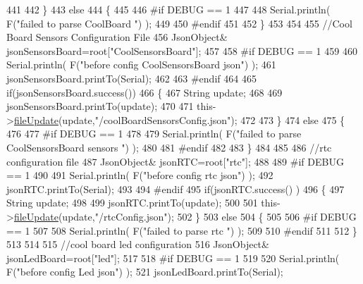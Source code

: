 \begin{DoxyCode}
441         
442     \}
443     \textcolor{keywordflow}{else}
444     \{
445     
446 \textcolor{preprocessor}{    #if DEBUG == 1 }
447 
448         Serial.println( F(\textcolor{stringliteral}{"failed to parse CoolBoard "}) );
449     
450 \textcolor{preprocessor}{    #endif}
451 
452     \}       
453 
454     
455     \textcolor{comment}{//Cool Board Sensors Configuration File}
456         JsonObject& jsonSensorsBoard=root[\textcolor{stringliteral}{"CoolSensorsBoard"}];
457 
458 \textcolor{preprocessor}{#if DEBUG == 1 }
459 
460     Serial.println( F(\textcolor{stringliteral}{"before config CoolSensorsBoard json"}) );
461     jsonSensorsBoard.printTo(Serial);
462 
463 \textcolor{preprocessor}{#endif }
464     
465     \textcolor{keywordflow}{if}(jsonSensorsBoard.success())
466     \{   
467         String update;
468     
469         jsonSensorsBoard.printTo(update);
470 
471         this->\hyperlink{classCoolFileSystem_a13f2958f5b87757c31fc53797a30d23a}{fileUpdate}(update,\textcolor{stringliteral}{"/coolBoardSensorsConfig.json"});      
472 
473     \}
474     \textcolor{keywordflow}{else}
475     \{
476 
477 \textcolor{preprocessor}{    #if DEBUG == 1}
478 
479         Serial.println( F(\textcolor{stringliteral}{"failed to parse CoolSensorsBoard sensors "}) );   
480     
481 \textcolor{preprocessor}{    #endif}
482 
483     \}
484 
485     
486     \textcolor{comment}{//rtc configuration file}
487         JsonObject& jsonRTC=root[\textcolor{stringliteral}{"rtc"}];
488 
489 \textcolor{preprocessor}{#if DEBUG == 1 }
490     
491     Serial.println( F(\textcolor{stringliteral}{"before config rtc json"}) );
492     jsonRTC.printTo(Serial);
493 
494 \textcolor{preprocessor}{#endif}
495     \textcolor{keywordflow}{if}(jsonRTC.success() )
496     \{
497         String update;
498 
499         jsonRTC.printTo(update);
500 
501         this->\hyperlink{classCoolFileSystem_a13f2958f5b87757c31fc53797a30d23a}{fileUpdate}(update,\textcolor{stringliteral}{"/rtcConfig.json"});           
502     \}
503     \textcolor{keywordflow}{else}
504     \{
505     
506 \textcolor{preprocessor}{    #if DEBUG == 1 }
507 
508         Serial.println( F(\textcolor{stringliteral}{"failed to parse rtc "}) );
509     
510 \textcolor{preprocessor}{    #endif}
511 
512     \}
513     
514     
515         \textcolor{comment}{//cool board led configuration}
516         JsonObject& jsonLedBoard=root[\textcolor{stringliteral}{"led"}];
517     
518 \textcolor{preprocessor}{#if DEBUG == 1 }
519 
520     Serial.println( F(\textcolor{stringliteral}{"before config Led json"}) );
521     jsonLedBoard.printTo(Serial);

\end{DoxyCode}
